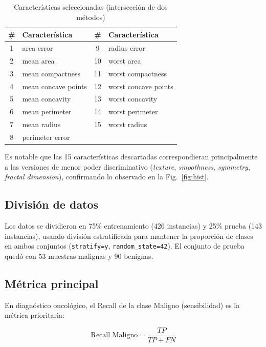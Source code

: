 \documentclass[journal]{IEEEtran}
\begin{document}
\begin{table}[!ht]
\centering
\caption{Características seleccionadas (intersección de dos métodos)}
\label{tab:features}
\begin{tabular}{clcl}
\toprule
\textbf{\#} & \textbf{Característica} & \textbf{\#} & \textbf{Característica} \\
\midrule
1  & area error           & 9  & radius error         \\
2  & mean area            & 10 & worst area           \\
3  & mean compactness     & 11 & worst compactness    \\
4  & mean concave points  & 12 & worst concave points \\
5  & mean concavity       & 13 & worst concavity      \\
6  & mean perimeter       & 14 & worst perimeter      \\
7  & mean radius          & 15 & worst radius         \\
8  & perimeter error      &    &                      \\
\bottomrule
\end{tabular}
\end{table}

Es notable que las 15 características descartadas correspondieran principalmente a las versiones de menor poder discriminativo (\textit{texture}, \textit{smoothness}, \textit{symmetry}, \textit{fractal dimension}), confirmando lo observado en la Fig.~\ref{fig:hist}.

\subsection{División de datos}

Los datos se dividieron en 75\% entrenamiento (426 instancias) y 25\% prueba (143 instancias), usando división estratificada para mantener la proporción de clases en ambos conjuntos (\texttt{stratify=y}, \texttt{random\_state=42}). El conjunto de prueba quedó con 53 muestras malignas y 90 benignas.

\subsection{Métrica principal}

En diagnóstico oncológico, el Recall de la clase Maligno (sensibilidad) es la métrica prioritaria:

\begin{equation}
  \text{Recall Maligno} = \frac{TP}{TP + FN}
\end{equation}
\end{document}
